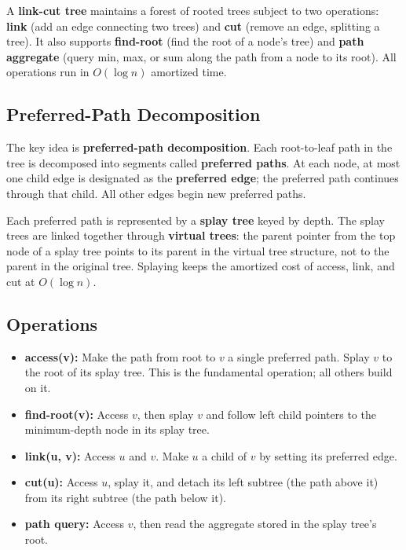A \textbf{link-cut tree} maintains a forest of rooted trees subject to two operations: \textbf{link} (add an edge connecting two trees) and \textbf{cut} (remove an edge, splitting a tree). It also supports \textbf{find-root} (find the root of a node's tree) and \textbf{path aggregate} (query min, max, or sum along the path from a node to its root). All operations run in $O(\log n)$ amortized time.

\subsection{Preferred-Path Decomposition}

The key idea is \textbf{preferred-path decomposition}. Each root-to-leaf path in the tree is decomposed into segments called \textbf{preferred paths}. At each node, at most one child edge is designated as the \textbf{preferred edge}; the preferred path continues through that child. All other edges begin new preferred paths.

Each preferred path is represented by a \textbf{splay tree} keyed by depth. The splay trees are linked together through \textbf{virtual trees}: the parent pointer from the top node of a splay tree points to its parent in the virtual tree structure, not to the parent in the original tree. Splaying keeps the amortized cost of access, link, and cut at $O(\log n)$.

\subsection{Operations}

\begin{itemize}
\item \textbf{access(v):} Make the path from root to $v$ a single preferred path. Splay $v$ to the root of its splay tree. This is the fundamental operation; all others build on it.
\item \textbf{find-root(v):} Access $v$, then splay $v$ and follow left child pointers to the minimum-depth node in its splay tree.
\item \textbf{link(u, v):} Access $u$ and $v$. Make $u$ a child of $v$ by setting its preferred edge.
\item \textbf{cut(u):} Access $u$, splay it, and detach its left subtree (the path above it) from its right subtree (the path below it).
\item \textbf{path query:} Access $v$, then read the aggregate stored in the splay tree's root.
\end{itemize}

